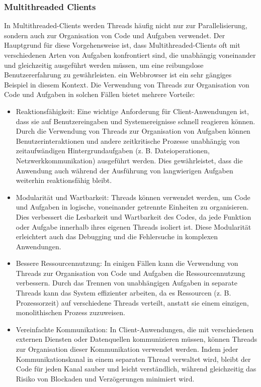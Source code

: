 \subsubsection{Multithreaded Clients}
In Multithreaded-Clients werden Threads häufig nicht nur zur Parallelisierung, sondern auch zur Organisation von Code und Aufgaben verwendet. Der Hauptgrund für diese Vorgehensweise ist, dass Multithreaded-Clients oft mit verschiedenen Arten von Aufgaben konfrontiert sind, die unabhängig voneinander und gleichzeitig ausgeführt werden müssen, um eine reibungslose Benutzererfahrung zu gewährleisten. ein Webbrowser ist ein sehr gängiges Beispiel in diesem Kontext. Die Verwendung von Threads zur Organisation von Code und Aufgaben in solchen Fällen bietet mehrere Vorteile:
\begin{itemize}
\item Reaktionsfähigkeit: Eine wichtige Anforderung für Client-Anwendungen ist, dass sie auf Benutzereingaben und Systemereignisse schnell reagieren können. Durch die Verwendung von Threads zur Organisation von Aufgaben können Benutzerinteraktionen und andere zeitkritische Prozesse unabhängig von zeitaufwändigen Hintergrundaufgaben (z. B. Dateioperationen, Netzwerkkommunikation) ausgeführt werden. Dies gewährleistet, dass die Anwendung auch während der Ausführung von langwierigen Aufgaben weiterhin reaktionsfähig bleibt.
\item Modularität und Wartbarkeit: Threads können verwendet werden, um Code und Aufgaben in logische, voneinander getrennte Einheiten zu organisieren. Dies verbessert die Lesbarkeit und Wartbarkeit des Codes, da jede Funktion oder Aufgabe innerhalb ihres eigenen Threads isoliert ist. Diese Modularität erleichtert auch das Debugging und die Fehlersuche in komplexen Anwendungen.
\item Bessere Ressourcennutzung: In einigen Fällen kann die Verwendung von Threads zur Organisation von Code und Aufgaben die Ressourcennutzung verbessern. Durch das Trennen von unabhängigen Aufgaben in separate Threads kann das System effizienter arbeiten, da es Ressourcen (z. B. Prozessorzeit) auf verschiedene Threads verteilt, anstatt sie einem einzigen, monolithischen Prozess zuzuweisen.
\item Vereinfachte Kommunikation: In Client-Anwendungen, die mit verschiedenen externen Diensten oder Datenquellen kommunizieren müssen, können Threads zur Organisation dieser Kommunikation verwendet werden. Indem jeder Kommunikationskanal in einem separaten Thread verwaltet wird, bleibt der Code für jeden Kanal sauber und leicht verständlich, während gleichzeitig das Risiko von Blockaden und Verzögerungen minimiert wird.
\end{itemize}
